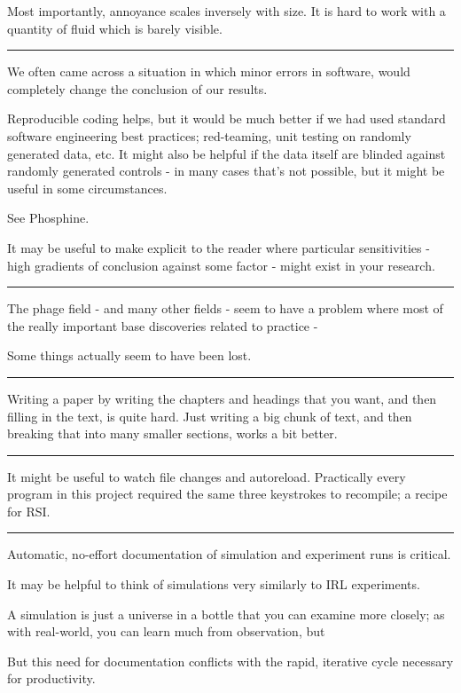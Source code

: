 \documentclass[paper.tex]{subfiles}
\begin{document}
Most importantly, annoyance scales inversely with size. It is hard to work with a quantity of fluid which is barely visible.

\rule{\linewidth}{0.2pt}

We often came across a situation in which minor errors in software,  would completely change the conclusion of our results.

Reproducible coding helps, but it would be much better if we had used standard software engineering best practices; red-teaming, unit testing on randomly generated data, etc. It might also be helpful if the data itself are blinded against randomly generated controls - in many cases that's not possible, but it might be useful in some circumstances.

See Phosphine.

It may be useful to make explicit to the reader where particular sensitivities - high gradients of conclusion against some factor - might exist in your research.

\rule{\linewidth}{0.2pt}

The phage field - and many other fields - seem to have a problem where most of the really important base discoveries related to practice - 

Some things actually seem to have been lost.

\rule{\linewidth}{0.2pt}

Writing a paper by writing the chapters and headings that you want, and then filling in the text, is quite hard. Just writing a big chunk of text, and then breaking that into many smaller sections, works a bit better.


\rule{\linewidth}{0.2pt}

It might be useful to watch file changes and autoreload. Practically every program in this project required the same three keystrokes to recompile; a recipe for RSI.

\rule{\linewidth}{0.2pt}

Automatic, no-effort documentation of simulation and experiment runs is critical.

It may be helpful to think of simulations very similarly to IRL experiments. 

A simulation is just a universe in a bottle that you can examine more closely; as with real-world, you can learn much from observation, but 

But this need for documentation conflicts with the rapid, iterative cycle necessary for productivity.
\end{document}
